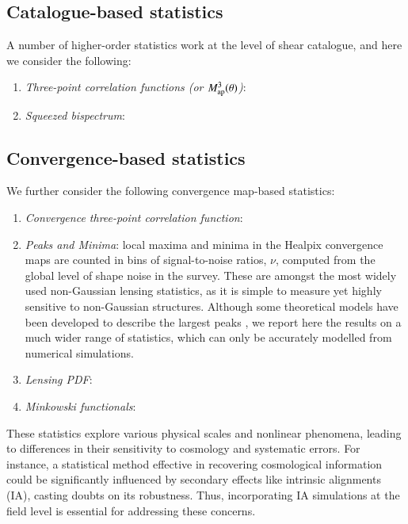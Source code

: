  
\subsection{Catalogue-based statistics}

A number of higher-order statistics work at the level of shear catalogue,  and here we consider the following:
\begin{enumerate}
\item {\it Three-point correlation functions (or $M_{\rm ap}^3(\theta)$)}:  
\item {\it Squeezed bispectrum}: 
\end{enumerate}

\subsection{Convergence-based statistics}

We further consider the following convergence map-based statistics:
\begin{enumerate}
    \item \textit{Convergence three-point correlation function}: 
    \item \textit{Peaks and Minima}: local maxima and minima in the {\sc Healpix} convergence maps are counted in bins of signal-to-noise ratios, $\nu$, computed from the global level of shape noise in the survey. 
    These are amongst the most widely used non-Gaussian lensing statistics, as it is simple to measure yet highly sensitive to non-Gaussian structures.
    Although some theoretical models have been developed to describe the largest peaks \citep[see][]{Shan18, HSCY1_Peaks_th}, we report here the results on a much wider range of statistics, which can only be accurately modelled from numerical simulations.
    \item \textit{Lensing PDF}:  
    \item  \textit{Minkowski functionals}: 
\end{enumerate}

These statistics explore various physical scales and nonlinear phenomena, leading to differences in their sensitivity to cosmology and systematic errors.
For instance, a statistical method effective in recovering cosmological information could be significantly influenced by secondary effects like intrinsic alignments (IA), casting doubts on its robustness.
Thus, incorporating IA simulations at the field level is essential for addressing these concerns.


